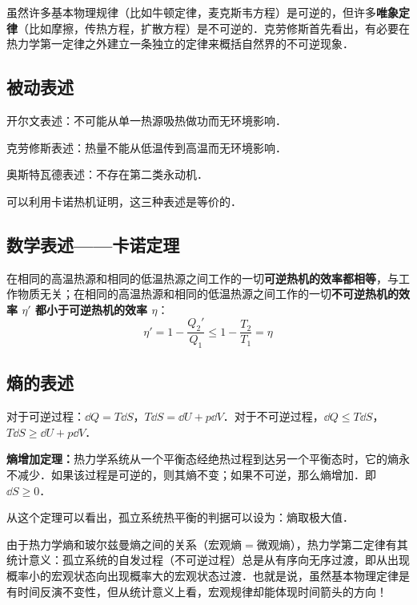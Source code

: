 
\begin{issues}
\issueDraft
\end{issues}


虽然许多基本物理规律（比如牛顿定律，麦克斯韦方程）是可逆的，但许多\textbf{唯象定律}（比如摩擦，传热方程，扩散方程）是不可逆的．克劳修斯首先看出，有必要在热力学第一定律之外建立一条独立的定律来概括自然界的不可逆现象．

\subsection{被动表述}
开尔文表述：不可能从单一热源吸热做功而无环境影响．

克劳修斯表述：热量不能从低温传到高温而无环境影响．

奥斯特瓦德表述：不存在第二类永动机．

可以利用卡诺热机证明，这三种表述是等价的．

\subsection{数学表述——卡诺定理}

在相同的高温热源和相同的低温热源之间工作的一切\textbf{可逆热机的效率都相等}，与工作物质无关；在相同的高温热源和相同的低温热源之间工作的一切\textbf{不可逆热机的效率 $\eta'$ 都小于可逆热机的效率 $\eta$}：
\begin{equation}
\eta'=1-\frac{Q_2'}{Q_1}\le 1-\frac{T_2}{T_1}=\eta
\end{equation}

\subsection{熵的表述}

对于可逆过程：$\dd Q=T\dd S$，$T\dd S=\dd U+p\dd V$．对于不可逆过程，$\dd Q\le T\dd S$，$T\dd S\ge \dd U+p\dd V$．

\textbf{熵增加定理：}热力学系统从一个平衡态经绝热过程到达另一个平衡态时，它的熵永不减少．如果该过程是可逆的，则其熵不变；如果不可逆，那么熵增加．即
$\dd S\ge 0$．

从这个定理可以看出，孤立系统热平衡的判据可以设为：熵取极大值．

由于热力学熵和玻尔兹曼熵之间的关系（宏观熵$=$微观熵），热力学第二定律有其统计意义：孤立系统的自发过程（不可逆过程）总是从有序向无序过渡，即从出现概率小的宏观状态向出现概率大的宏观状态过渡．也就是说，虽然基本物理定律是有时间反演不变性，但从统计意义上看，宏观规律却能体现时间箭头的方向！
